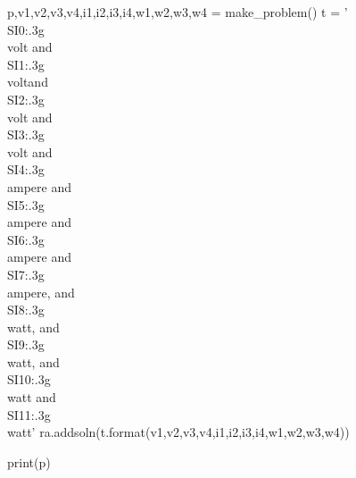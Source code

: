 \documentclass[12pt]{exam}
\begin{document}
\begin{questions}
\begin{pycode}
p,v1,v2,v3,v4,i1,i2,i3,i4,w1,w2,w3,w4 = make_problem()
t = '\\SI{{{0:.3g}}}{{\\volt}} and \\SI{{{1:.3g}}}{{\\volt}}and \\SI{{{2:.3g}}}{{\\volt}} and \\SI{{{3:.3g}}}{{\\volt}} and \\SI{{{4:.3g}}}{{\\ampere}} and \\SI{{{5:.3g}}}{{\\ampere}} and \\SI{{{6:.3g}}}{{\\ampere}} and \\SI{{{7:.3g}}}{{\\ampere}}, and \\SI{{{8:.3g}}}{{\\watt}}, and \\SI{{{9:.3g}}}{{\\watt}}, and \\SI{{{10:.3g}}}{{\\watt}} and \\SI{{{11:.3g}}}{{\\watt}}'
ra.addsoln(t.format(v1,v2,v3,v4,i1,i2,i3,i4,w1,w2,w3,w4))

print(p)

\end{pycode}


\end{questions}
	
\end{document}
